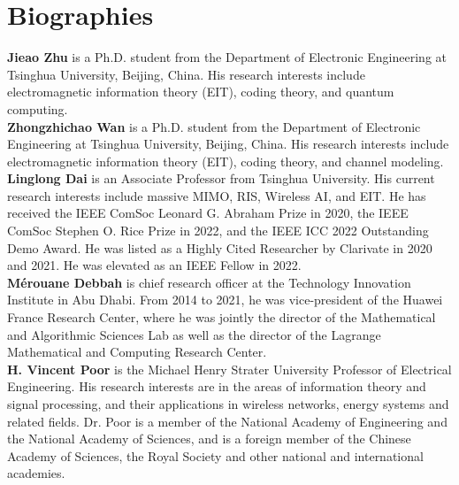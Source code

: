 \documentclass[journal,twocolumn]{IEEEtran}
\begin{document}
\footnotesize




\normalsize
\vspace{-1em}
\section*{Biographies}

{\bf Jieao Zhu} is a Ph.D. student from the Department of Electronic Engineering at Tsinghua University, Beijing, China. His research interests include electromagnetic information theory (EIT), coding theory, and quantum computing. 
\\

{\bf Zhongzhichao Wan} is a Ph.D. student from the Department of Electronic Engineering at Tsinghua University, Beijing, China. His research interests include electromagnetic information theory (EIT), coding theory, and channel modeling. 
\\


{\bf Linglong Dai} is an Associate Professor from Tsinghua University. His current research interests include massive MIMO, RIS, Wireless AI, and EIT. He has received the IEEE ComSoc Leonard G. Abraham Prize in 2020, the IEEE ComSoc Stephen O. Rice Prize in 2022, and the IEEE ICC 2022 Outstanding Demo Award. He was listed as a Highly Cited Researcher by Clarivate in 2020 and 2021. He was elevated as an IEEE Fellow in 2022.
\\

{\bf M\'{e}rouane Debbah} is chief research officer at the Technology Innovation Institute in Abu Dhabi. From 2014 to 2021, he was vice-president of the Huawei France Research Center, where he was jointly the director of the Mathematical and Algorithmic Sciences Lab as well as the director of the Lagrange Mathematical and Computing Research Center. 
\\

{\bf H. Vincent Poor} is the Michael Henry Strater University Professor of Electrical Engineering. His research interests are in the areas of information theory and signal processing, and their applications in wireless networks, energy systems and related fields. Dr. Poor is a member of the National Academy of Engineering and the National Academy of Sciences, and is a foreign member of the Chinese Academy of Sciences, the Royal Society and other national and international academies. 
\\
\end{document}
